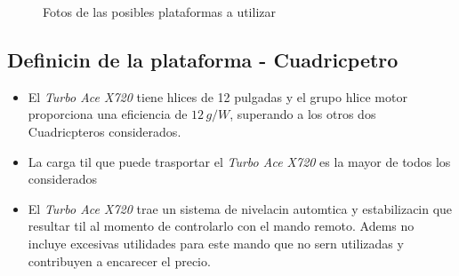 \documentclass[spanish,12pt,a4paper,titlepage]{report}
\begin{document}
\begin{figure} [h!]
  \centering
  \caption{Fotos de las posibles plataformas a utilizar}
  \label{fig:cuadricopteros}
\end{figure}

\subsection{Definicin de la plataforma - Cuadricpetro}

\begin{itemize}
	\item El \emph{Turbo Ace X720} tiene hlices de 12 pulgadas y el grupo hlice motor proporciona una eficiencia de $12\,g/W$, superando a los otros dos Cuadricpteros considerados.
	\item La carga til que puede trasportar el \emph{Turbo Ace X720} es la mayor de todos los considerados
	\item El \emph{Turbo Ace X720} trae un sistema de nivelacin automtica y estabilizacin que resultar til al momento de controlarlo con el mando remoto. Adems no incluye excesivas utilidades para este mando que no sern utilizadas y contribuyen a encarecer el precio.
\end{itemize}
\end{document}
